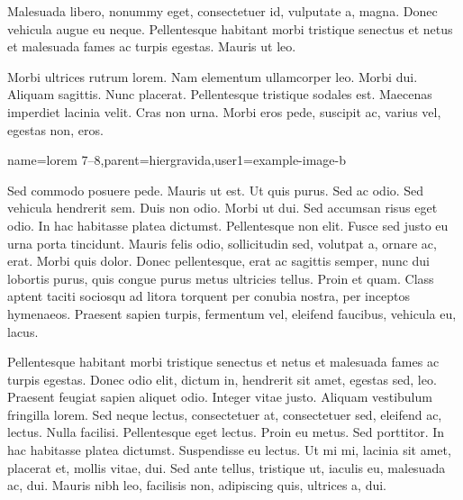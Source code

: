 {Malesuada libero, nonummy eget, consectetuer id, vulputate a, magna. Donec
vehicula augue eu neque. Pellentesque habitant morbi tristique
senectus et netus et malesuada fames ac turpis egestas. Mauris ut
leo.

Morbi ultrices rutrum lorem. Nam elementum ullamcorper
leo. Morbi dui. Aliquam sagittis. Nunc placerat.  Pellentesque
tristique sodales est. Maecenas imperdiet lacinia velit. Cras non
urna. Morbi eros pede, suscipit ac, varius vel, egestas non, eros.}

{name={lorem 7--8},parent={hiergravida},user1={example-image-b}}%
{%
Sed commodo posuere pede. Mauris ut est. Ut quis purus. Sed ac odio.
Sed vehicula hendrerit sem. Duis non odio.  Morbi ut dui. Sed
accumsan risus eget odio. In hac habitasse platea dictumst.
Pellentesque non elit. Fusce sed justo eu urna porta tincidunt.
Mauris felis odio, sollicitudin sed, volutpat a, ornare ac, erat.
Morbi quis dolor. Donec pellentesque, erat ac sagittis semper, nunc
dui lobortis purus, quis congue purus metus ultricies tellus. Proin
et quam. Class aptent taciti sociosqu ad litora torquent per conubia
nostra, per inceptos hymenaeos. Praesent sapien turpis, fermentum
vel, eleifend faucibus, vehicula eu, lacus.

Pellentesque habitant morbi tristique senectus et netus et malesuada
fames ac turpis egestas. Donec odio elit, dictum in, hendrerit sit
amet, egestas sed, leo. Praesent feugiat sapien aliquet odio.
Integer vitae justo. Aliquam vestibulum fringilla lorem. Sed neque
lectus, consectetuer at, consectetuer sed, eleifend ac, lectus.
Nulla facilisi. Pellentesque eget lectus.  Proin eu metus. Sed
porttitor. In hac habitasse platea dictumst.  Suspendisse eu lectus.
Ut mi mi, lacinia sit amet, placerat et, mollis vitae, dui. Sed ante
tellus, tristique ut, iaculis eu, malesuada ac, dui.  Mauris nibh
leo, facilisis non, adipiscing quis, ultrices a, dui.%
}

